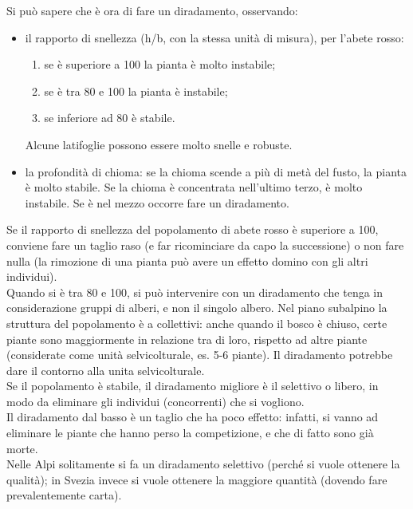 Si può sapere che è ora di fare un diradamento, osservando:
\begin{itemize}[nosep]
    \item il rapporto di snellezza (h/b, con la stessa unità di misura), per l'abete rosso:
    \begin{enumerate}[nosep]
        \item se è superiore a 100 la pianta è molto instabile;
        \item se è tra 80 e 100 la pianta è instabile;
        \item se inferiore ad 80 è stabile.
    \end{enumerate} 
    Alcune latifoglie possono essere molto snelle e robuste.
    \item la profondità di chioma: se la chioma scende a più di metà del fusto, la pianta è molto stabile. Se la chioma è concentrata nell'ultimo terzo, è molto instabile. Se è nel mezzo occorre fare un diradamento.
\end{itemize}
Se il rapporto di snellezza del popolamento di abete rosso è superiore a 100, conviene fare un taglio raso (e far ricominciare da capo la successione) o non fare nulla (la rimozione di una pianta può avere un effetto domino con gli altri individui).\\
Quando si è tra 80 e 100, si può intervenire con un diradamento che tenga in considerazione gruppi di alberi, e non il singolo albero. Nel piano subalpino la struttura del popolamento è a collettivi: anche quando il bosco è chiuso, certe piante sono maggiormente in relazione tra di loro, rispetto ad altre piante (considerate come unità selvicolturale, es. 5-6 piante). Il diradamento potrebbe dare il contorno alla unita selvicolturale.\\
Se il popolamento è stabile, il diradamento migliore è il selettivo o libero, in modo da eliminare gli individui (concorrenti) che si vogliono.\\
Il diradamento dal basso è un taglio che ha poco effetto: infatti, si vanno ad eliminare le piante che hanno perso la competizione, e che di fatto sono già morte.\\
Nelle Alpi solitamente si fa un diradamento selettivo (perché si vuole ottenere la qualità); in Svezia invece si vuole ottenere la maggiore quantità (dovendo fare prevalentemente carta).
